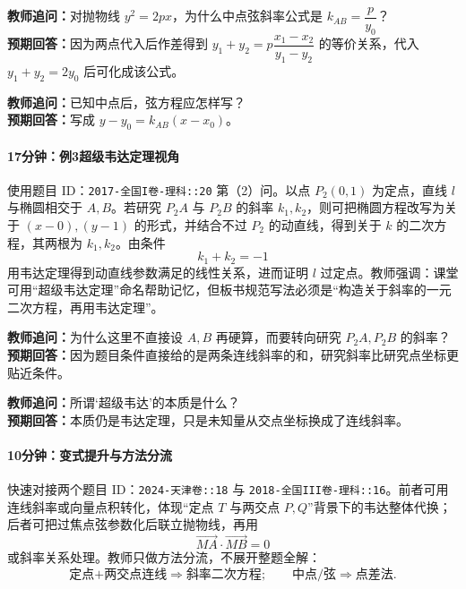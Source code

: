 \documentclass[UTF8,a4paper,11pt]{ctexart}
\begin{document}
\noindent\textbf{教师追问：}对抛物线 $y^2=2px$，为什么中点弦斜率公式是 $k_{AB}=\dfrac{p}{y_0}$？\\

\textbf{预期回答：}因为两点代入后作差得到 $y_1+y_2=p\dfrac{x_1-x_2}{y_1-y_2}$ 的等价关系，代入 $y_1+y_2=2y_0$ 后可化成该公式。\par

\noindent\textbf{教师追问：}已知中点后，弦方程应怎样写？\\

\textbf{预期回答：}写成 \(y-y_0=k_{AB}(x-x_0)\)。\par

\paragraph{17分钟：例3超级韦达定理视角}

使用题目 ID：\texttt{2017-全国I卷-理科::20} 第（2）问。以点 $P_2(0,1)$ 为定点，直线 $l$ 与椭圆相交于 $A,B$。若研究 $P_2A$ 与 $P_2B$ 的斜率 $k_1,k_2$，则可把椭圆方程改写为关于 $(x-0),(y-1)$ 的形式，并结合不过 $P_2$ 的动直线，得到关于 $k$ 的二次方程，其两根为 $k_1,k_2$。由条件\[k_1+k_2=-1\] 用韦达定理得到动直线参数满足的线性关系，进而证明 $l$ 过定点。教师强调：课堂可用“超级韦达定理”命名帮助记忆，但板书规范写法必须是“构造关于斜率的一元二次方程，再用韦达定理”。

\noindent\textbf{教师追问：}为什么这里不直接设 $A,B$ 再硬算，而要转向研究 $P_2A,P_2B$ 的斜率？\\

\textbf{预期回答：}因为题目条件直接给的是两条连线斜率的和，研究斜率比研究点坐标更贴近条件。\par

\noindent\textbf{教师追问：}所谓‘超级韦达’的本质是什么？\\

\textbf{预期回答：}本质仍是韦达定理，只是未知量从交点坐标换成了连线斜率。\par

\paragraph{10分钟：变式提升与方法分流}

快速对接两个题目 ID：\texttt{2024-天津卷::18} 与 \texttt{2018-全国III卷-理科::16}。前者可用连线斜率或向量点积转化，体现“定点 $T$ 与两交点 $P,Q$”背景下的韦达整体代换；后者可把过焦点弦参数化后联立抛物线，再用\[\overrightarrow{MA}\cdot\overrightarrow{MB}=0\] 或斜率关系处理。教师只做方法分流，不展开整题全解：\[\text{定点+两交点连线}\Rightarrow\text{斜率二次方程};\qquad \text{中点/弦}\Rightarrow\text{点差法}.\]
\end{document}
